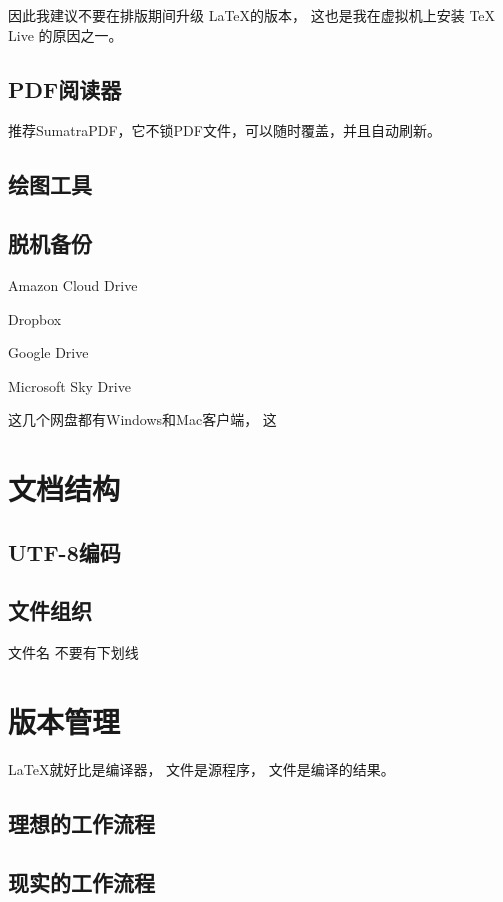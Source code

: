 \vspace{1ex}
因此我建议不要在排版期间升级 \LaTeX 的版本，
这也是我在虚拟机上安装 TeX Live 的原因之一。

\subsection{PDF阅读器}
推荐SumatraPDF，它不锁PDF文件，可以随时覆盖，并且自动刷新。
\subsection{绘图工具}

\subsection{脱机备份}
\begindot
\item Amazon Cloud Drive
\item Dropbox
\item Google Drive
\item Microsoft Sky Drive
\myenddot

这几个网盘都有Windows和Mac客户端，
这


\section{文档结构}
\subsection{UTF-8编码}
\subsection{ 文件组织}
文件名
不要有下划线

\section{版本管理}
\LaTeX 就好比是编译器，
 文件是源程序，
 文件是编译的结果。

\subsection{理想的工作流程}
\subsection{现实的工作流程}

